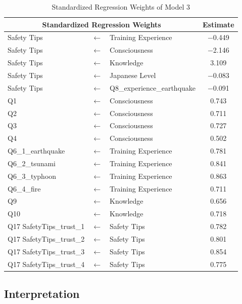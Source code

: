 \begin{table}[h]
\caption{Standardized Regression Weights of Model 3 }
\label{table22}
\centering
\begin{tabular}{|l|c|l|c|}
\hline
\multicolumn{3}{|c|}{Standardized Regression Weights} & Estimate \\
\hline
Safety Tips & $\longleftarrow$ & Training Experience & $-$0.449 \\
Safety Tips & $\longleftarrow$ & Consciousness & $-$2.146 \\
Safety Tips & $\longleftarrow$ & Knowledge & 3.109 \\
Safety Tips & $\longleftarrow$ & Japanese Level & $-$0.083\\
Safety Tips & $\longleftarrow$ & Q8\_experience\_earthquake & $-$0.091 \\
Q1 & $\longleftarrow$ & Consciousness & 0.743 \\
Q2 & $\longleftarrow$ & Consciousness & 0.711 \\
Q3 & $\longleftarrow$ & Consciousness & 0.727 \\
Q4 & $\longleftarrow$ & Consciousness & 0.502 \\
Q6\_1\_earthquake & $\longleftarrow$ & Training Experience & 0.781 \\
Q6\_2\_tsunami & $\longleftarrow$ & Training Experience & 0.841 \\
Q6\_3\_typhoon & $\longleftarrow$ & Training Experience & 0.863 \\
Q6\_4\_fire & $\longleftarrow$ & Training Experience & 0.711 \\
Q9 & $\longleftarrow$ & Knowledge & 0.656 \\
Q10 & $\longleftarrow$ & Knowledge & 0.718 \\
Q17 SafetyTips\_trust\_1 & $\longleftarrow$ & Safety Tips & 0.782 \\
Q17 SafetyTips\_trust\_2 & $\longleftarrow$ & Safety Tips & 0.801 \\
Q17 SafetyTips\_trust\_3 & $\longleftarrow$ & Safety Tips & 0.854 \\
Q17 SafetyTips\_trust\_4 & $\longleftarrow$ & Safety Tips & 0.775 \\
\hline
\end{tabular}
\end{table}




\subsection{Interpretation}

